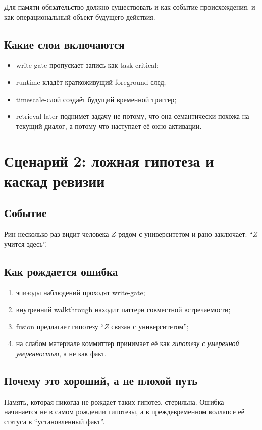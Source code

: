 \begin{principle}
Для памяти обязательство должно существовать и как событие происхождения, и как
операциональный объект будущего действия.
\end{principle}

\subsection*{Какие слои включаются}
\begin{itemize}
\item write-gate пропускает запись как task-critical;
\item runtime кладёт краткоживущий foreground-след;
\item timescale-слой создаёт будущий временной триггер;
\item retrieval later поднимет задачу не потому, что она семантически похожа на
текущий диалог, а потому что наступает её окно активации.
\end{itemize}

\section{Сценарий 2: ложная гипотеза и каскад ревизии}

\subsection*{Событие}
Рин несколько раз видит человека $Z$ рядом с университетом и рано заключает:
``$Z$ учится здесь''.

\subsection*{Как рождается ошибка}
\begin{enumerate}
\item эпизоды наблюдений проходят write-gate;
\item внутренний walkthrough находит паттерн совместной встречаемости;
\item fusion предлагает гипотезу ``$Z$ связан с университетом'';
\item на слабом материале коммиттер принимает её как \emph{гипотезу с умеренной уверенностью}, а не как факт.
\end{enumerate}

\subsection*{Почему это хороший, а не плохой путь}
Память, которая никогда не рождает таких гипотез, стерильна. Ошибка начинается не в
самом рождении гипотезы, а в преждевременном коллапсе её статуса в ``установленный
факт''.

